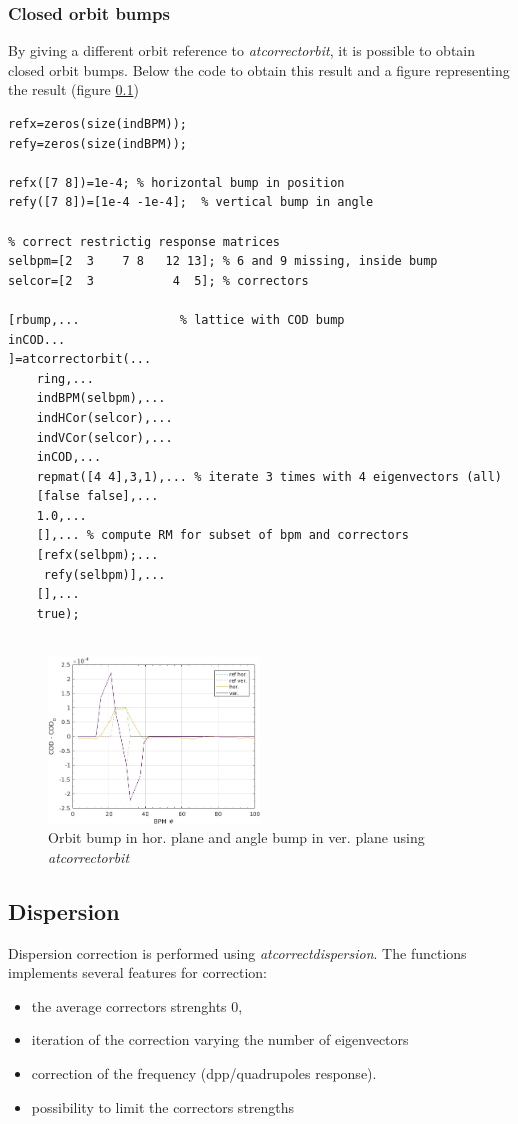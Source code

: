 \clearpage
\subsubsection{Closed orbit bumps}
By giving a different orbit reference to \emph{atcorrectorbit}, it is possible to obtain closed orbit bumps. 
Below the code to obtain this result and a figure representing the result (figure \ref{})
\begin{lstlisting}
refx=zeros(size(indBPM));
refy=zeros(size(indBPM));

refx([7 8])=1e-4; % horizontal bump in position
refy([7 8])=[1e-4 -1e-4];  % vertical bump in angle

% correct restrictig response matrices
selbpm=[2  3    7 8   12 13]; % 6 and 9 missing, inside bump
selcor=[2  3           4  5]; % correctors

[rbump,...  			% lattice with COD bump
inCOD...
]=atcorrectorbit(...
    ring,...
    indBPM(selbpm),...
    indHCor(selcor),...
    indVCor(selcor),...
    inCOD,...
    repmat([4 4],3,1),... % iterate 3 times with 4 eigenvectors (all)
    [false false],...
    1.0,...
    [],... % compute RM for subset of bpm and correctors
    [refx(selbpm);...
     refy(selbpm)],...
    [],...
    true);
		
\end{lstlisting}

\begin{figure}[!h]
	\centering
	\includegraphics[width=0.5\textwidth]{./images/corrections/CODbump.jpg}
	\caption{Orbit bump in hor. plane and angle bump in ver. plane using \emph{atcorrectorbit}}
	\label{fig:orbitbump}
\end{figure}

\newpage
\subsection{Dispersion}

Dispersion correction is performed using \emph{atcorrectdispersion}. The functions implements several features for correction:
\begin{itemize}
\item the average correctors strenghts 0, 
\item iteration of the correction varying the number of eigenvectors 
\item correction of the frequency (dpp/quadrupoles response).
\item possibility to limit the correctors strengths
\end{itemize}

